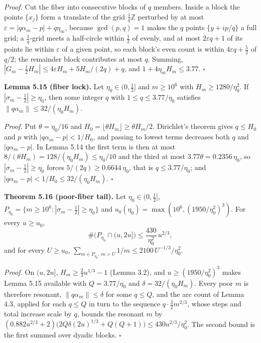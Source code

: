 \documentclass[11pt,a4paper]{article}
\begin{document}
\emph{Proof.} Cut the fiber into consecutive blocks of \(q\) members.
Inside a block the points \(\{x_j\}\) form a translate of the grid
\(\tfrac1q\mathbb Z\) perturbed by at most
\(\varepsilon=|q\alpha_m-p|+q\eta_m\), because \(\gcd(p,q)=1\) makes the
\(q\) points \(\{y+ip/q\}\) a full grid; a \(\tfrac1q\)-grid meets a
half-circle within \(\tfrac12\) of evenly, and at most
\(2\varepsilon q+1\) of its points lie within \(\varepsilon\) of a given
point, so each block's even count is within \(4\varepsilon q+\tfrac52\)
of \(q/2\); the remainder block contributes at most \(q\). Summing,
\(|G_m-\tfrac12H_m|\le4\varepsilon
H_m+5H_m/(2q)+q\), and \(1+4\eta_mH_m\le3.77\). \(\square\)

\textbf{Lemma 5.15 (fiber lock).} Let \(\eta_0\in(0,\tfrac12]\) and
\(m\ge10^6\) with \(H_m\ge1280/\eta_0^2\). If
\(|\sigma_m-\tfrac12|\ge\eta_0\), then some integer \(q\) with
\(1\le q\le3.77/\eta_0\) satisfies \(\|q\alpha_m\|\le32/(\eta_0H_m)\).

\emph{Proof.} Put \(\theta=\eta_0/16\) and
\(H_0=\lfloor\theta H_m\rfloor\ge
\theta H_m/2\). Dirichlet's theorem gives \(q\le H_0\) and \(p\) with
\(|q\alpha_m-p|<1/H_0\), and passing to lowest terms decreases both
\(q\) and \(|q\alpha_m-p|\). In Lemma 5.14 the first term is then at
most \(8/(\theta H_m)=128/(\eta_0H_m)\le\eta_0/10\) and the third at
most \(3.77\theta=0.2356\,\eta_0\), so \(|\sigma_m-\tfrac12|\ge\eta_0\)
forces \(5/(2q)\ge0.6644\,\eta_0\), that is \(q\le3.77/\eta_0\); and
\(|q\alpha_m-p|<1/H_0\le32/(\eta_0H_m)\). \(\square\)

\textbf{Theorem 5.16 (poor-fiber tail).} Let \(\eta_0\in(0,\tfrac12]\),
\(P_{\eta_0}=\{m\ge10^6:|\sigma_m-\tfrac12|\ge\eta_0\}\) and
\(u_0(\eta_0)=\max(10^6,(1950/\eta_0^2)^3)\). For every \(u\ge u_0\), \[
\#\bigl(P_{\eta_0}\cap(u,2u]\bigr)\le\frac{430}{\eta_0^2}\,u^{2/3},
\] and for every \(U\ge u_0\),
\(\sum_{m\in P_{\eta_0},\,m>U}1/m\le2100\,U^{-1/3}/\eta_0^2\).

\emph{Proof.} On \((u,2u]\), \(H_m\ge\tfrac23u^{1/3}-1\) (Lemma 3.2),
and \(u\ge(1950/\eta_0^2)^3\) makes Lemma 5.15 available with
\(Q=3.77/\eta_0\) and \(\delta=32/(\eta_0H_m)\). Every poor \(m\) is
therefore resonant, \(\|q\alpha_m\|\le\delta\) for some \(q\le Q\), and
the arc count of Lemma 4.3, applied for each \(q\le Q\) in turn to the
sequence \(q\cdot\tfrac32m^{2/3}\), whose steps and total increase scale
by \(q\), bounds the resonant \(m\) by
\((0.882u^{2/3}+2)\bigl(2Q\delta(2u)^{1/3}+Q(Q+1)\bigr)\le430u^{2/3}/\eta_0^2\).
The second bound is the first summed over dyadic blocks. \(\square\)
\end{document}
